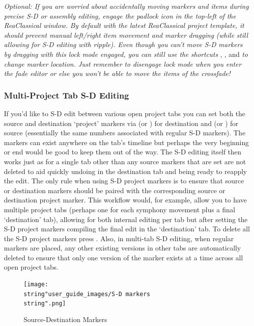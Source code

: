\documentclass[10pt,american]{article}
\begin{document}
\emph{Optional: If you are worried about accidentally moving markers and items
during precise S-D or assembly editing, engage the padlock icon in the top-left
of the ReaClassical window. By default with the latest ReaClassical project
template, it should prevent manual left/right item movement and marker dragging
(while still allowing for S-D editing with ripple). Even though you can't move
S-D markers by dragging with this lock mode engaged, you can still use the
shortcuts }, ,  and \emph{ to change marker
location. Just remember to disengage lock mode when you enter the fade editor or
else you won't be able to move the items of the crossfade!}

\subsubsection{\label{subsec:Multi-Project-Tab-S-D}Multi-Project Tab S-D
Editing}

If you'd like to S-D edit between various open project tabs you can set both the
source and destination `project' markers via  (or
) for destination and  (or
) for source (essentially the same numbers associated with
regular S-D markers). The markers can exist anywhere on the tab's timeline but
perhaps the very beginning or end would be good to keep them out of the way. The
S-D editing itself then works just as for a single tab other than any source
markers that are set are not deleted to aid quickly undoing in the destination
tab and being ready to reapply the edit. The only rule when using S-D project
markers is to ensure that source or destination markers should be paired with
the corresponding source or destination project marker. This workflow would, for
example, allow you to have multiple project tabs (perhaps one for each symphony
movement plus a final `destination' tab), allowing for both internal editing per
tab but after setting the S-D project markers compiling the final edit in the
`destination' tab. To delete all the S-D project markers press
\keys{\shift+\del}. Also, in multi-tab S-D editing, when regular markers are
placed, any other existing versions in other tabs are automatically deleted to
ensure that only one version of the marker exists at a time across all open
project tabs.

\begin{figure}
\begin{centering}
\texttt{[image: \\string"user\_guide\_images/S-D markers\\string".png]}
\par\end{centering}
\caption{Source-Destination Markers}

\end{figure}
\end{document}
